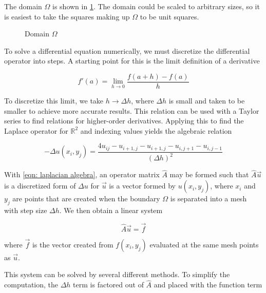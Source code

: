 \documentclass[10pt,a4paper]{article}
\begin{document}
The domain $\Omega$ is shown in \cref{fig: domain}. The domain could be scaled to arbitrary sizes, so it is easiest to take the squares making up $\Omega$ to be unit squares.

\begin{figure}[float]
\center
{}
\caption{Domain $\Omega$}
\label{fig: domain}
\end{figure}

To solve a differential equation numerically, we must discretize the differential operator into steps. A starting point for this is the limit definition of a derivative

\begin{equation}
\label{eqn: limit derivative}
f'(a) = \lim\limits_{h \to 0} \frac{f(a + h) - f(a)}{h}
\end{equation}

To discretize this limit, we take $h \to \Delta h$, where $\Delta h$ is small and taken to be smaller to achieve more accurate results. This relation can be used with a Taylor series to find relations for higher-order derivatives. Applying this to find the Laplace operator for $\mathbb{R}^2$ and indexing values yields the algebraic relation

\begin{equation}
\label{eqn: laplacian algebra}
- \Delta u(x_i, y_j) = \frac{4u_{ij} - u_{i+1, j} - u_{i+1, j} - u_{i, j+1} - u_{i, j-1}}{\left( \Delta h \right)^2}
\end{equation}

With \cref{eqn: laplacian algebra}, an operator matrix $\hat{A}$ may be formed such that $\hat{A} \vec{u}$ is a discretized form of $\Delta u$ for $\vec{u}$ is a vector formed by $u(x_i, y_j)$, where $x_i$ and $y_j$ are  points that are created when the boundary $\Omega$ is separated into a mesh with step size $\Delta h$. We then obtain a linear system

\begin{equation}
\label{eqn: linear system}
\hat{A} \vec{u} = \vec{f}
\end{equation}

where $\vec{f}$ is the vector created from $f(x_i, y_j)$ evaluated at the same mesh points as $\vec{u}$. 

This system can be solved by several different methods. To simplify the computation, the $\Delta h$ term is factored out of $\hat{A}$ and placed with the function term
\end{document}
